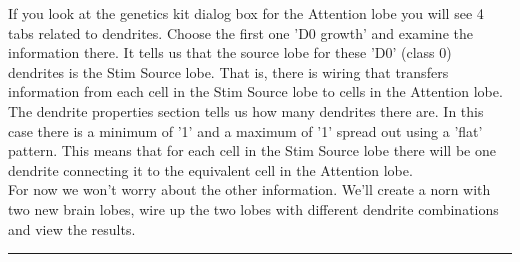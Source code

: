 \documentclass[11pt,twoside,a4paper]{article}
\begin{document}
If you look at the genetics kit dialog box for the Attention lobe you will see 4 tabs related to dendrites. Choose the first one 'D0 growth' and examine the information there. It tells us that the source lobe for these 'D0' (class 0) dendrites is the Stim Source lobe. That is, there is wiring that transfers information from each cell in the Stim Source lobe to cells in the Attention lobe.~\\

The dendrite properties section tells us how many dendrites there are. In this case there is a minimum of '1' and a maximum of '1' spread out using a 'flat' pattern. This means that for each cell in the Stim Source lobe there will be one dendrite connecting it to the equivalent cell in the Attention lobe.~\\

For now we won't worry about the other information. We'll create a norn with two new brain lobes, wire up the two lobes with different dendrite combinations and view the results.~\\


\rule{10cm}{0.5mm}~\\

\end{document}
